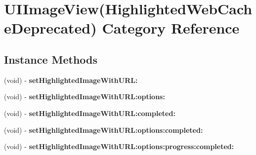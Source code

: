 \hypertarget{category_u_i_image_view_07_highlighted_web_cache_deprecated_08}{}\section{U\+I\+Image\+View(Highlighted\+Web\+Cache\+Deprecated) Category Reference}
\label{category_u_i_image_view_07_highlighted_web_cache_deprecated_08}
\subsection*{Instance Methods}
\begin{DoxyCompactItemize}
\item 
\mbox{\label{category_u_i_image_view_07_highlighted_web_cache_deprecated_08_ac812fd81114de815a4238045acb43445}} 
(void) -\/ {\bfseries set\+Highlighted\+Image\+With\+U\+R\+L\+:}
\item 
\mbox{\label{category_u_i_image_view_07_highlighted_web_cache_deprecated_08_a2bd061c465ca398dd62daae24ebc86fc}} 
(void) -\/ {\bfseries set\+Highlighted\+Image\+With\+U\+R\+L\+:options\+:}
\item 
\mbox{\label{category_u_i_image_view_07_highlighted_web_cache_deprecated_08_a75c246067498b4528688fdc61d6989bd}} 
(void) -\/ {\bfseries set\+Highlighted\+Image\+With\+U\+R\+L\+:completed\+:}
\item 
\mbox{\label{category_u_i_image_view_07_highlighted_web_cache_deprecated_08_a501b2bd3725b08ca2dbb5b0c24ce15e4}} 
(void) -\/ {\bfseries set\+Highlighted\+Image\+With\+U\+R\+L\+:options\+:completed\+:}
\item 
\mbox{\label{category_u_i_image_view_07_highlighted_web_cache_deprecated_08_ab41175b78f491f6e13f912443618357c}} 
(void) -\/ {\bfseries set\+Highlighted\+Image\+With\+U\+R\+L\+:options\+:progress\+:completed\+:}
\item 
\mbox{\label{category_u_i_image_view_07_highlighted_web_cache_deprecated_08_afb53abd0302272b5f57ad21a8a5b8444}} 

\end{DoxyCompactItemize}
